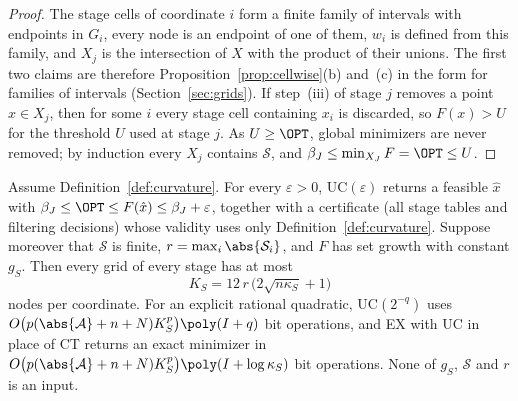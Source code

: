 \begin{proof}
The stage cells of coordinate $i$ form a finite family of intervals with
endpoints in $G_i$, every node is an endpoint of one of them, $w_i$ is
defined from this family, and $X_j$ is the intersection of $X$ with the
product of their unions. The first two claims are therefore
Proposition~\ref{prop:cellwise}(b) and~(c) in the form for families of
intervals (Section~\ref{sec:grids}). If step~(iii) of stage $j$ removes a
point $x\in X_j$, then for some $i$ every stage cell containing $x_i$ is
discarded, so $F(x)>U$ for the threshold $U$ used at stage $j$. As
$U\ge\OPT$, global minimizers are never removed; by induction every $X_j$
contains $\mathcal S$, and $\beta_J\le\min_{X_J}F=\OPT\le U$.
\end{proof}

\begin{theorem}\label{thm:cells}
Assume Definition~\ref{def:curvature}. For every $\varepsilon>0$,
UC$(\varepsilon)$ returns a feasible $\hat x$ with
$\beta_J\le\OPT\le F(\hat x)\le\beta_J+\varepsilon$, together with a
certificate (all stage tables and filtering decisions) whose validity uses
only Definition~\ref{def:curvature}. Suppose moreover that $\mathcal S$ is
finite, $r=\max_i\abs{\mathcal S_i}$, and $F$ has set growth with constant
$g_S$. Then every grid of every stage has at most
\begin{equation}\label{eq:cellcount}
K_S=12\,r\,\bigl(2\sqrt{n\kappa_S}+1\bigr)
\end{equation}
nodes per coordinate. For an explicit rational quadratic, UC$(2^{-q})$ uses
$O\bigl(p(\abs{\mathcal A}+n+N)K_S^p\bigr)\poly(I+q)$ bit operations, and
EX with UC in place of CT returns an exact minimizer in
$O\bigl(p(\abs{\mathcal A}+n+N)K_S^p\bigr)\poly(I+\log\kappa_S)$ bit
operations. None of $g_S$, $\mathcal S$ and $r$ is an input.
\end{theorem}

